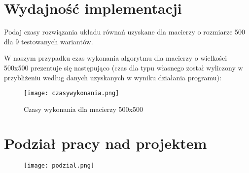 \documentclass[10pt]{article}
\newenvironment{exercise}[2][Ćwiczenie]{\begin{trivlist}
\item[\hskip \labelsep {\bfseries #1}\hskip \labelsep {\bfseries #2.}]}{\end{trivlist}}
\begin{document}
\section {Wydajność implementacji}
\begin{exercise}{2}
Podaj czasy rozwiązania układu równań uzyskane dla macierzy o rozmiarze 500 dla 9 testowanych wariantów.
\end{exercise}
W naszym przypadku czas wykonania algorytmu dla macierzy o wielkości 500x500 prezentuje się następująco (czas dla typu własnego został wyliczony w przybliżeniu według danych uzyskanych w wyniku działania programu):\\
\begin{center}
\begin{figure}[!htb]
\centering
\texttt{[image: czasywykonania.png]}\\
\caption{Czasy wykonania dla macierzy 500x500}\label{Fig:Data2}
\end{figure}
\end{center}
\vspace{-1.5cm}
\section {Podział pracy nad projektem}
\vspace{-0.5cm}
\begin{figure}[!htb]
\centering
\texttt{[image: podzial.png]}
\end{figure}
\end{document}
